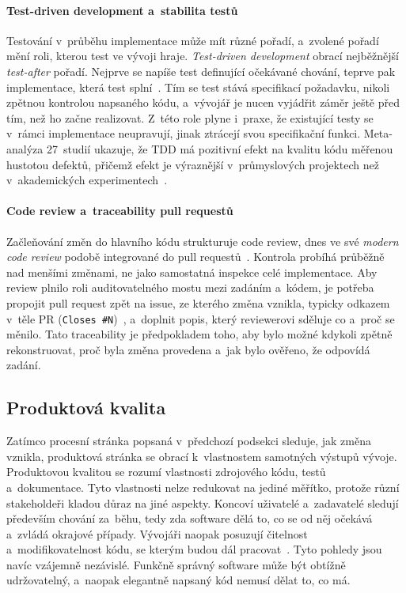 \paragraph{Test-driven development a~stabilita testů}
Testování v~průběhu implementace může mít různé pořadí, a~zvolené
pořadí mění roli, kterou test ve vývoji hraje. \textit{Test-driven
development} obrací nejběžnější \textit{test-after} pořadí. Nejprve
se napíše test definující očekávané chování, teprve pak implementace,
která test splní~\cite{beck2000}. Tím se test stává specifikací
požadavku, nikoli zpětnou kontrolou napsaného kódu, a~vývojář je
nucen vyjádřit záměr ještě před tím, než ho začne realizovat.
Z~této role plyne i~praxe, že existující testy se v~rámci
implementace neupravují, jinak ztrácejí svou specifikační funkci.
Meta-analýza 27~studií ukazuje, že TDD má pozitivní efekt na
kvalitu kódu měřenou hustotou defektů, přičemž efekt je výraznější
v~průmyslových projektech než v~akademických experimentech~\cite{rafique2013}.

\paragraph{Code review a~traceability pull requestů}
Začleňování změn do hlavního kódu strukturuje code review, dnes ve
své \textit{modern code review} podobě integrované do pull
requestů~\cite{bacchelli2013}. Kontrola probíhá průběžně nad menšími
změnami, ne jako samostatná inspekce celé implementace. Aby review
plnilo roli auditovatelného mostu mezi zadáním a~kódem, je potřeba
propojit pull request zpět na issue, ze kterého změna vznikla,
typicky odkazem v~těle PR (\texttt{Closes \#N})~\cite{gotel1994},
a~doplnit popis, který reviewerovi sděluje co a~proč se měnilo.
Tato traceability je předpokladem toho, aby bylo možné kdykoli
zpětně rekonstruovat, proč byla změna provedena a~jak bylo ověřeno,
že odpovídá zadání.

\vspace{0.3em}

\subsection{Produktová kvalita}
\label{sec:produktova-kvalita}
\label{sec:dimenze-kvality}
\label{sec:testovani-mutation}
\label{sec:staticka-analyza}
\label{sec:definice-komplexita}

Zatímco procesní stránka popsaná v~předchozí podsekci sleduje, jak
změna vznikla, produktová stránka se obrací k~vlastnostem samotných
výstupů vývoje. Produktovou kvalitou se rozumí vlastnosti zdrojového
kódu, testů a~dokumentace. Tyto vlastnosti nelze redukovat na jediné
měřítko, protože různí stakeholdeři kladou důraz na jiné aspekty.
Koncoví uživatelé a~zadavatelé sledují především chování za~běhu,
tedy zda software dělá to, co se od něj očekává a~zvládá okrajové případy.
Vývojáři naopak posuzují čitelnost a~modifikovatelnost kódu,
se kterým budou dál pracovat~\cite{kitchenham1996}. Tyto pohledy
jsou navíc vzájemně nezávislé. Funkčně správný software může být obtížně
udržovatelný,
a~naopak elegantně napsaný kód nemusí dělat to, co má.

